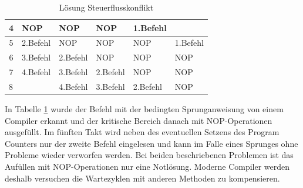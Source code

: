 \documentclass[12pt]{article}
\begin{document}
\begin{table}[!htb]
\begin{tabular}{|c|l|l|l|l|l|}
4                       & \cellcolor[HTML]{F8A102}NOP                                                             & \cellcolor[HTML]{F8A102}NOP                                                                & \cellcolor[HTML]{F8A102}NOP                                                                 & \cellcolor[HTML]{9698ED}1.Befehl        &                                                                                               \\ \hline
5                       & \cellcolor[HTML]{38FFF8}2.Befehl                                                        & \cellcolor[HTML]{F8A102}NOP                                                                & \cellcolor[HTML]{F8A102}NOP                                                                 & \cellcolor[HTML]{F8A102}NOP             & \cellcolor[HTML]{9698ED}1.Befehl                                                              \\ \hline
6                       & \cellcolor[HTML]{67FD9A}3.Befehl                                                        & \cellcolor[HTML]{38FFF8}2.Befehl                                                           & \cellcolor[HTML]{F8A102}NOP                                                                 & \cellcolor[HTML]{F8A102}NOP             & \cellcolor[HTML]{F8A102}NOP                                                                   \\ \hline
7                       & \cellcolor[HTML]{FFFE65}4.Befehl                                                        & \cellcolor[HTML]{67FD9A}3.Befehl                                                           & \cellcolor[HTML]{38FFF8}2.Befehl                                                            & \cellcolor[HTML]{F8A102}NOP             & \cellcolor[HTML]{F8A102}NOP                                                                   \\ \hline
\multicolumn{1}{|l|}{8} &                                                                                         & \cellcolor[HTML]{FFFE65}4.Befehl                                                           & \cellcolor[HTML]{67FD9A}3.Befehl                                                            & \cellcolor[HTML]{38FFF8}2.Befehl        & \cellcolor[HTML]{F8A102}NOP                                                                   \\ \hline
\end{tabular}
\caption{Lösung Steuerflusskonflikt}
\label{tab:Steuerflusskonflikt}
\end{table}
\noindent In Tabelle
 \ref{tab:Steuerflusskonflikt} wurde der Befehl mit der bedingten Sprunganweisung von einem Compiler erkannt und der kritische Bereich danach mit NOP-Operationen ausgefüllt. Im fünften Takt wird neben des eventuellen Setzens des Program Counters nur der zweite Befehl eingelesen und kann im Falle eines Sprunges ohne Probleme wieder verworfen werden. Bei beiden beschriebenen Problemen ist das Aufüllen mit NOP-Operationen nur eine Notlösung. Moderne Compiler werden deshalb versuchen die Wartezyklen mit anderen Methoden zu kompensieren.
\end{document}
